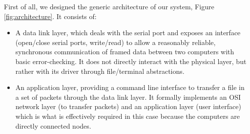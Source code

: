 \documentclass[a4paper, 11pt]{report}
\begin{document}
First of all, we designed the generic architecture of our system, Figure \ref{fig:architecture}. It consists of:
\begin{itemize}
	\itemsep0em
	\item A data link layer, which deals with the serial port and exposes an interface (open/close serial ports, write/read) to allow a reasonably reliable, synchronous communication of framed data between two computers with basic error-checking. It does not directly interact with the physical layer, but rather with its driver through file/terminal abstractions.
	\item An application layer, providing a command line interface to transfer a file in a set of packets through the data link layer. It formally implements an OSI network layer (to transfer packets) and an application layer (user interface) which is what is effectively required in this case because the computers are directly connected nodes.
\end{itemize}
\end{document}
